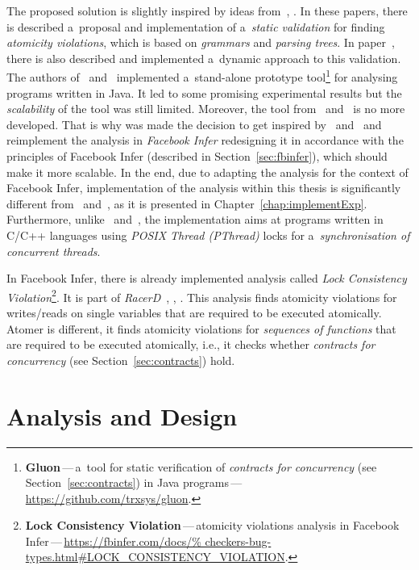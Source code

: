 The proposed solution is slightly inspired by ideas from~\cite{contracts2017},
\cite{contracts2015}. In these papers, there is described a~proposal
and implementation of a~\emph{static validation} for finding
\emph{atomicity violations}, which is based on \emph{grammars} and
\emph{parsing trees}. In paper~\cite{contracts2017}, there is also described
and implemented a~dynamic approach to this validation. The authors
of~\cite{contracts2017} and~\cite{contracts2015} implemented a~stand-alone
prototype tool\footnote{\textbf{Gluon}\,---\,a~tool for static verification of
\emph{contracts for concurrency} (see Section~\ref{sec:contracts}) in Java
programs\,---\,\url{https://github.com/trxsys/gluon}.} for analysing programs
written in Java. It led to some promising experimental results but the
\emph{scalability} of the tool was still limited. Moreover, the tool
from~\cite{contracts2017} and~\cite{contracts2015} is no more developed. That
is why was made the decision to get inspired by~\cite{contracts2017}
and~\cite{contracts2015} and reimplement the analysis in \emph{Facebook Infer}
redesigning it in accordance with the principles of Facebook Infer (described in
Section~\ref{sec:fbinfer}), which should make it more scalable. In the end, due
to adapting the analysis for the context of Facebook Infer, implementation of
the analysis within this thesis is significantly different
from~\cite{contracts2017} and~\cite{contracts2015}, as it is presented in
Chapter~\ref{chap:implementExp}. Furthermore, unlike~\cite{contracts2017}
and~\cite{contracts2015}, the implementation aims at programs written
in C/C++ languages using \emph{POSIX Thread (PThread)} locks for
a~\emph{synchronisation of concurrent threads}.

In Facebook Infer, there is already implemented analysis called
\emph{Lock Consistency Violation}\footnote{\textbf{Lock Consistency
Violation}\,---\,atomicity violations analysis in Facebook
Infer\,---\,\url{https://fbinfer.com/docs/%
checkers-bug-types.html\#LOCK_CONSISTENCY_VIOLATION}.}. It is part of
\emph{RacerD}~\cite{racerD}, \cite{racerDOnline},
\cite{staticRaceDetectorTruePositive}. This analysis finds atomicity
violations for writes/reads on single variables that are required to
be executed atomically. Atomer is different, it finds atomicity
violations for \emph{sequences of functions} that are required to be
executed atomically, i.e., it checks whether \emph{contracts for
concurrency} (see Section~\ref{sec:contracts}) hold.


\section{Analysis and Design}
\label{sec:design}

